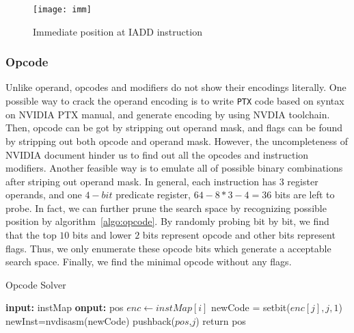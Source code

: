 \begin{figure}[htbp]
\begin{center}
\texttt{[image: imm]}
    \caption{Immediate position at IADD instruction}
\label{fig:imm}
\end{center}
\end{figure}

\subsubsection{Opcode}
Unlike operand, opcodes and modifiers do not show their encodings literally. One possible way to crack the operand encoding is to write {\tt PTX} code
based on syntax on NVIDIA PTX manual, and generate encoding by using NVDIA toolchain.
Then, opcode can be got by stripping out operand mask, and flags can be found by stripping out both opcode and operand mask. However, the uncompleteness of NVIDIA document hinder us to find out all the opcodes and instruction modifiers. Another feasible way is to emulate all of possible binary combinations after striping out operand mask.
In general, each instruction has $3$ register operands, and one $4-bit$ predicate register, $64-8*3-4=36$ bits are left to probe.
In fact, we can further prune the search space by recognizing possible position by algorithm~\ref{algo:opcode}. By randomly probing bit by bit, we find that the top $10$ bits and lower $2$ bits represent opcode and other bits represent flags. Thus, we only enumerate these opcode bits which generate a acceptable search space. Finally, we find the minimal opcode without any flags. 


\begin{algorithm}
      \caption{Opcode Solver}\label{algo:opcode}
  \begin{algorithmic}[1]
      \State \textbf {input:} instMap
      \State \textbf {onput:} pos
      \State $enc \gets instMap[i]$ 
      \State newCode = setbit($enc[j], j, 1$)
      \State newInst=nvdisasm(newCode)
      \State pushback($pos$,$j$)
      \EndIf
      \EndIf
      \EndFor
      \EndFor
      \State return pos
  \end{algorithmic}
\end{algorithm}

